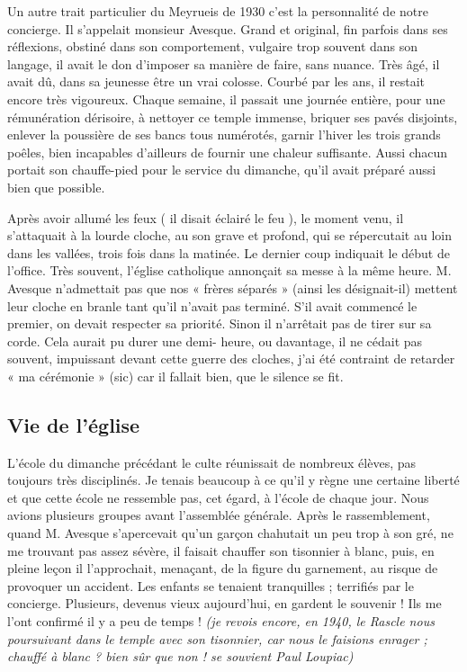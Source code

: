 Un autre trait particulier du Meyrueis de 1930 c’est la personnalité de notre
concierge. Il s’appelait monsieur Avesque. Grand et original, fin parfois dans ses
réflexions, obstiné dans son comportement, vulgaire trop souvent dans son langage, il
avait le don d’imposer sa manière de faire, sans nuance. Très âgé, il avait dû, dans sa
jeunesse être un vrai colosse. Courbé par les ans, il restait encore très vigoureux.
Chaque semaine, il passait une journée entière, pour une rémunération dérisoire, à
nettoyer ce temple immense, briquer ses pavés disjoints, enlever la poussière de ses
bancs tous numérotés, garnir l’hiver les trois grands poêles, bien incapables d’ailleurs
de fournir une chaleur suffisante. Aussi chacun portait son chauffe-pied pour le
service du dimanche, qu’il avait préparé aussi bien que possible.

Après avoir allumé les feux ( il disait éclairé le feu ), le moment venu, il s’attaquait à
la lourde cloche, au son grave et profond, qui se répercutait au loin dans les vallées,
trois fois dans la matinée. Le dernier coup indiquait le début de l’office. Très souvent,
l’église catholique annonçait sa messe à la même heure. M. Avesque n’admettait pas
que nos « frères séparés » (ainsi les désignait-il) mettent leur cloche en branle tant
qu’il n’avait pas terminé. S’il avait commencé le premier, on devait respecter sa
priorité. Sinon il n’arrêtait pas de tirer sur sa corde. Cela aurait pu durer une demi-
heure, ou davantage, il ne cédait pas souvent, impuissant devant cette guerre des
cloches, j’ai été contraint de retarder « ma cérémonie » (sic) car il fallait bien, que le
silence se fit.

\subsection{Vie de l’église}

L’école du dimanche précédant le culte réunissait de nombreux élèves, pas toujours
très disciplinés. Je tenais beaucoup à ce qu’il y règne une certaine liberté et que cette
école ne ressemble pas, cet égard, à l’école de chaque jour. Nous avions plusieurs
groupes avant l’assemblée générale. Après le rassemblement, quand M. Avesque
s’apercevait qu’un garçon chahutait un peu trop à son gré, ne me trouvant pas assez
sévère, il faisait chauffer son tisonnier à blanc, puis, en pleine leçon il l’approchait, menaçant, de la figure du garnement, au risque de provoquer un accident. Les enfants
se tenaient tranquilles ; terrifiés par le concierge. Plusieurs, devenus vieux
aujourd’hui, en gardent le souvenir ! Ils me l’ont confirmé il y a peu de temps !
\emph{(je revois encore, en 1940, le Rascle nous poursuivant dans le temple avec son tisonnier, car nous le
faisions enrager ; chauffé à blanc ? bien sûr que non ! se souvient Paul Loupiac)}


